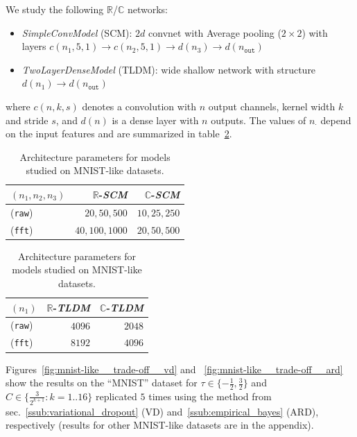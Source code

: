 \documentclass[a4paper,10pt]{article}
\newcommand{\real}{\mathbb{R}}
\newcommand{\cplx}{\mathbb{C}}
\begin{document}
We study the following $\real$/$\cplx$ networks:
\begin{itemize}
  \item \textit{SimpleConvModel} (SCM): $2d$ convnet with Average pooling ($2\times 2$)
  with layers $c(n_1, 5, 1) \to c(n_2, 5, 1) \to d(n_3) \to d(n_\mathtt{out})$
  \item \textit{TwoLayerDenseModel} (TLDM): wide shallow network with structure
  $d(n_1) \to d(n_\mathtt{out})$
\end{itemize}
where $c(n, k, s)$ denotes a convolution with $n$ output channels, kernel width $k$ and
stride $s$, and $d(n)$ is a dense layer with $n$ outputs. The values of $n_\cdot$ depend
on the input features and are summarized in table~\ref{tbl:mnist-like-model-spec}.
\begin{table}[hb]
  \centering
  \caption{Architecture parameters for models studied on MNIST-like datasets.}
  \label{tbl:mnist-like-model-spec}
  \begin{tabular}{lrr}
    \toprule
    $(n_1, n_2, n_3)$  & $\real$-\textit{SCM} & $\cplx$-\textit{SCM} \\
    \midrule
    (\texttt{raw}) & $20, 50, 500$ & $10, 25, 250$ \\
    (\texttt{fft}) & $40, 100, 1000$ & $20, 50, 500$ \\
    \bottomrule
  \end{tabular}
  \begin{tabular}{lrr}
    \toprule
    $(n_1)$  & $\real$-\textit{TLDM} & $\cplx$-\textit{TLDM} \\
    \midrule
    (\texttt{raw}) & $4096$ & $2048$ \\
    (\texttt{fft}) & $8192$ & $4096$ \\
    \bottomrule
  \end{tabular}
\end{table}

Figures~\ref{fig:mnist-like__trade-off__vd} and ~\ref{fig:mnist-like__trade-off__ard} show
the results on the ``MNIST'' dataset for $\tau\in\{-\tfrac12, \tfrac32\}$ and $
  C \in \{\tfrac3{2^{k+1}}\colon k=1..16\}
$ replicated $5$ times using the method from sec.~\ref{ssub:variational_dropout} (VD)
and~\ref{ssub:empirical_bayes} (ARD), respectively (results for other MNIST-like datasets
are in the appendix).

\end{document}
